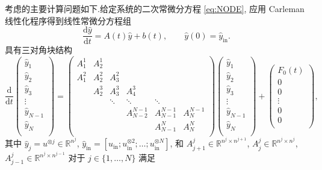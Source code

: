 \begin{method}
	考虑的主要计算问题如下.给定系统的二次常微分方程 \cref{eq:NODE}, 应用 Carleman 线性化程序得到线性常微分方程组
	\begin{equation}
		\frac{\mathrm{d}\hat y}{\mathrm{d}t} = A(t) \hat y + b(t), \qquad
		\hat y(0) = \hat y_{\mathrm{in}}.
		\label{eq:LODE}
	\end{equation}
	具有三对角块结构
	\begin{equation}
		\frac{\mathrm{d}}{\mathrm{d}t}
		\begin{pmatrix}
			\hat y_1 \\
			\hat y_2 \\
			\hat y_3 \\
			\vdots \\
			\hat y_{N-1} \\
			\hat y_N \\
		\end{pmatrix}
		=
		\begin{pmatrix}
			A_1^1 & A_2^1 &  &  &  &  \\
			A_1^2 & A_2^2 & A_3^2 & &  &  \\
			& A_2^3 & A_3^3 & A_4^3 &  &  \\
			&  & \ddots & \ddots & \ddots &  \\
			&  &  & A_{N-2}^{N-1} & A_{N-1}^{N-1} & A_N^{N-1} \\
			&  &  &  & A_{N-1}^N & A_N^N \\
		\end{pmatrix}
		\begin{pmatrix}
			\hat y_1 \\
			\hat y_2 \\
			\hat y_3 \\
			\vdots \\
			\hat y_{N-1} \\
			\hat y_N \\
		\end{pmatrix}+
		\begin{pmatrix}
			F_0(t) \\
			0 \\
			0 \\
			\vdots \\
			0 \\
			0 \\
		\end{pmatrix},
		\label{eq:UODE}
	\end{equation}
	其中 $\hat y_j=u^{\otimes j}\in\mathbb{R}^{n^j}$, $\hat y_{\mathrm{in}}=[u_{\mathrm{in}}; u_{\mathrm{in}}^{\otimes 2}; \ldots; u_{\mathrm{in}}^{\otimes N}]$, 和 $A_{j+1}^j \in \mathbb{R}^{n^j\times n^{j+1}}$, $A_j^j \in \mathbb{R}^{n^j\times n^j}$, $A_{j-1}^j \in \mathbb{R}^{n^j\times n^{j-1}}$ 对于 $j\in\{1,\ldots,N\}$ 满足
	

\end{method}
